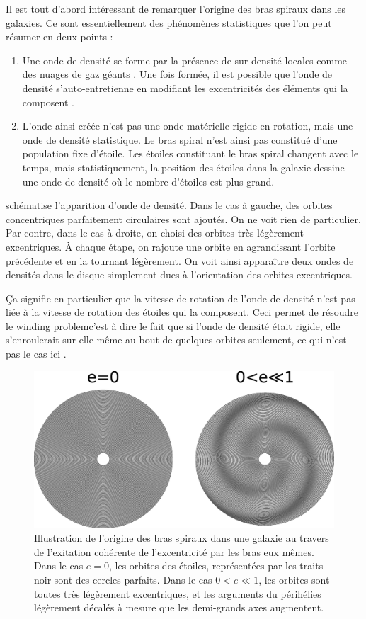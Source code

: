 Il est tout d'abord intéressant de remarquer l'origine des bras spiraux dans les galaxies. Ce sont essentiellement des phénomènes statistiques que l'on peut résumer en deux points : 
\begin{enumerate}
\item Une onde de densité se forme par la présence de sur-densité locales comme des nuages de gaz géants \citep{donghia2013self}. Une fois formée, il est possible que l'onde de densité s'auto-entretienne en modifiant les excentricités des éléments qui la composent \citep{binney2008book}.

\item L'onde ainsi créée n'est pas une onde matérielle rigide en rotation, mais une onde de densité statistique. Le bras spiral n'est ainsi pas constitué d'une population fixe d'étoile. Les étoiles constituant le bras spiral changent avec le temps, mais statistiquement, la position des étoiles dans la galaxie dessine une onde de densité où le nombre d'étoiles est plus grand. 
\end{enumerate}

 schématise l'apparition d'onde de densité. Dans le cas à gauche, des orbites concentriques parfaitement circulaires sont ajoutés. On ne voit rien de particulier. Par contre, dans le cas à droite, on choisi des orbites très légèrement excentriques. À chaque étape, on rajoute une orbite en agrandissant l'orbite précédente et en la tournant légèrement. On voit ainsi apparaître deux ondes de densités dans le disque simplement dues à l'orientation des orbites excentriques.

Ça signifie en particulier que la vitesse de rotation de l'onde de densité n'est pas liée à la vitesse de rotation des étoiles qui la composent. Ceci permet de résoudre le \og winding problem\fg c'est à dire le fait que si l'onde de densité était rigide, elle s'enroulerait sur elle-même au bout de quelques orbites seulement, ce qui n'est pas le cas ici \citep{binney2008book}.

\begin{figure}[htbp]
\centering
\includegraphics[width=0.9\linewidth]{figure/spiral_arms.pdf}
\caption{Illustration de l'origine des bras spiraux dans une galaxie au travers de l'exitation cohérente de l'excentricité par les bras eux mêmes. Dans le cas \og $e=0$\fg, les orbites des étoiles, représentées par les traits noir sont des cercles parfaits. Dans le cas \og $0<e\ll 1$\fg, les orbites sont toutes très légèrement excentriques, et les arguments du périhélies légèrement décalés à mesure que les demi-grands axes augmentent.}\label{fig:spiral_arms}
\end{figure}

